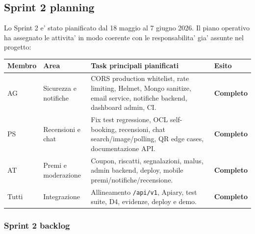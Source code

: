 \documentclass[11pt,a4paper]{article}
\newcommand{\ok}{\textcolor{revalueGreen}{\textbf{Completo}}}
\newcommand{\code}[1]{\texttt{#1}}
\begin{document}
\subsection{Sprint 2 planning}

Lo Sprint 2 e' stato pianificato dal 18 maggio al 7 giugno 2026. Il piano operativo
ha assegnato le attivita' in modo coerente con le responsabilita' gia' assunte nel
progetto:

\begin{longtable}{L{2.1cm} L{4cm} L{6.2cm} L{2.2cm}}
\toprule
\textbf{Membro} & \textbf{Area} & \textbf{Task principali pianificati} & \textbf{Esito} \\
\midrule
AG & Sicurezza e notifiche &
CORS production whitelist, rate limiting, Helmet, Mongo sanitize, email service, notifiche backend, dashboard admin, CI. & \ok \\
\midrule
PS & Recensioni e chat &
Fix test regressione, OCL self-booking, recensioni, chat search/image/polling, QR edge cases, documentazione API. & \ok \\
\midrule
AT & Premi e moderazione &
Coupon, riscatti, segnalazioni, malus, admin backend, deploy, mobile premi/notifiche/recensione. & \ok \\
\midrule
Tutti & Integrazione &
Allineamento \code{/api/v1}, Apiary, test suite, D4, evidenze, deploy e demo. & \ok \\
\bottomrule
\end{longtable}

\subsubsection{Sprint 2 backlog}
\end{document}
